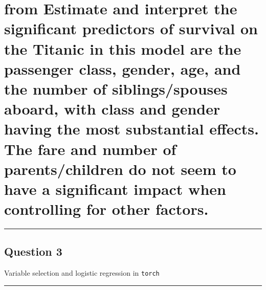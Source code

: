 \documentclass[
  letterpaper,
  DIV=11,
  numbers=noendperiod]{scrartcl}
\begin{document}
\hypertarget{from-estimate-and-interpret-the-significant-predictors-of-survival-on-the-titanic-in-this-model-are-the-passenger-class-gender-age-and-the-number-of-siblingsspouses-aboard-with-class-and-gender-having-the-most-substantial-effects.-the-fare-and-number-of-parentschildren-do-not-seem-to-have-a-significant-impact-when-controlling-for-other-factors.}{%
\section{from Estimate and interpret the significant predictors of
survival on the Titanic in this model are the passenger class, gender,
age, and the number of siblings/spouses aboard, with class and gender
having the most substantial effects. The fare and number of
parents/children do not seem to have a significant impact when
controlling for other
factors.}\label{from-estimate-and-interpret-the-significant-predictors-of-survival-on-the-titanic-in-this-model-are-the-passenger-class-gender-age-and-the-number-of-siblingsspouses-aboard-with-class-and-gender-having-the-most-substantial-effects.-the-fare-and-number-of-parentschildren-do-not-seem-to-have-a-significant-impact-when-controlling-for-other-factors.}}

\begin{center}\rule{0.5\linewidth}{0.5pt}\end{center}

\hypertarget{question-3}{%
\subsection{Question 3}\label{question-3}}

\begin{tcolorbox}[enhanced jigsaw, leftrule=.75mm, left=2mm, coltitle=black, rightrule=.15mm, titlerule=0mm, colbacktitle=quarto-callout-tip-color!10!white, toprule=.15mm, bottomrule=.15mm, opacityback=0, arc=.35mm, colframe=quarto-callout-tip-color-frame, title=\textcolor{quarto-callout-tip-color}{\faLightbulb}\hspace{0.5em}{70 points}, opacitybacktitle=0.6, toptitle=1mm, breakable, bottomtitle=1mm, colback=white]

Variable selection and logistic regression in \texttt{torch}

\end{tcolorbox}

\begin{center}\rule{0.5\linewidth}{0.5pt}\end{center}
\end{document}
